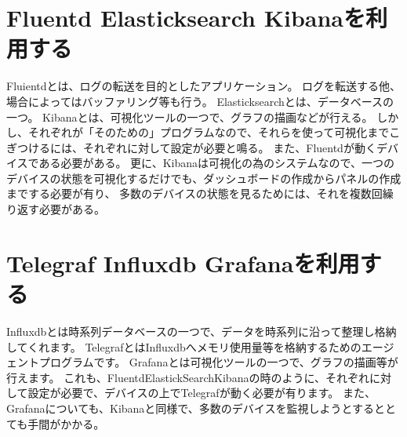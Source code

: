\section{Fluentd Elasticksearch Kibanaを利用する}
Fluientdとは、ログの転送を目的としたアプリケーション。
ログを転送する他、場合によってはバッファリング等も行う。
Elasticksearchとは、データベースの一つ。
Kibanaとは、可視化ツールの一つで、グラフの描画などが行える。
しかし、それぞれが「そのための」プログラムなので、それらを使って可視化までこぎつけるには、それぞれに対して設定が必要と鳴る。
また、Fluentdが動くデバイスである必要がある。
更に、Kibanaは可視化の為のシステムなので、一つのデバイスの状態を可視化するだけでも、ダッシュボードの作成からパネルの作成までする必要が有り、
多数のデバイスの状態を見るためには、それを複数回繰り返す必要がある。

\section{Telegraf Influxdb Grafanaを利用する}
Influxdbとは時系列データベースの一つで、データを時系列に沿って整理し格納してくれます。
TelegrafとはInfluxdbへメモリ使用量等を格納するためのエージェントプログラムです。
Grafanaとは可視化ツールの一つで、グラフの描画等が行えます。
これも、FluentdElastickSearchKibanaの時のように、それぞれに対して設定が必要で、デバイスの上でTelegrafが動く必要が有ります。
また、Grafanaについても、Kibanaと同様で、多数のデバイスを監視しようとするととても手間がかかる。



